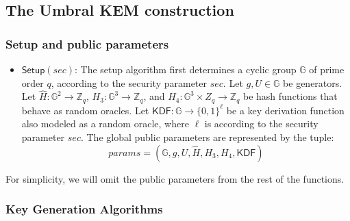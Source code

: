 \documentclass{amsart}
\begin{document}
\subsection{The Umbral KEM construction}

\subsubsection{Setup and public parameters}\label{sec:setup_umbral}

\begin{itemize}

\item $\mathsf{Setup}(sec)$: The setup algorithm first determines a cyclic group $\mathbb G$ of prime order $q$, according to the security parameter $sec$. Let $g, U\in \mathbb G$ be generators. Let $\hat H: \mathbb G^2 \to \mathbb Z_q$, $H_3: \mathbb G^3 \to \mathbb Z_q$, and $H_4: \mathbb G^3 \times Z_q \to \mathbb Z_q$ be hash functions that behave as random oracles. Let $\mathsf{KDF}: \mathbb G \to \{0,1\}^\ell$ be a key derivation function also modeled as a random oracle, where $\ell$ is according to the security parameter $sec$. The global public parameters are represented by the tuple:
$$params = (\mathbb G, g, U, \hat H, H_3, H_4, \mathsf{KDF})$$

\end{itemize}

For simplicity, we will omit the public parameters from the rest of the functions. 

\subsubsection{Key Generation Algorithms}
\end{document}
